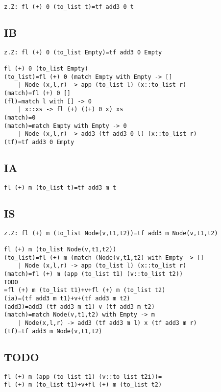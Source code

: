 \documentclass{article}
\begin{document}
\begin{lstlisting}
z.Z: fl (+) 0 (to_list t)=tf add3 0 t
\end{lstlisting}

\subsection*{IB}

\begin{lstlisting}
z.Z: fl (+) 0 (to_list Empty)=tf add3 0 Empty

fl (+) 0 (to_list Empty)
(to_list)=fl (+) 0 (match Empty with Empty -> []
	| Node (x,l,r) -> app (to_list l) (x::to_list r)
(match)=fl (+) 0 []
(fl)=match l with [] -> 0
	| x::xs -> fl (+) ((+) 0 x) xs
(match)=0
(match)=match Empty with Empty -> 0
	| Node (x,l,r) -> add3 (tf add3 0 l) (x::to_list r)
(tf)=tf add3 0 Empty
\end{lstlisting}

\subsection*{IA}

\begin{lstlisting}
fl (+) m (to_list t)=tf add3 m t
\end{lstlisting}

\subsection*{IS}

\begin{lstlisting}
z.Z: fl (+) m (to_list Node(v,t1,t2))=tf add3 m Node(v,t1,t2)

fl (+) m (to_list Node(v,t1,t2))
(to_list)=fl (+) m (match (Node(v,t1,t2) with Empty -> []
	| Node (x,l,r) -> app (to_list l) (x::to_list r)
(match)=fl (+) m (app (to_list t1) (v::to_list t2))
TODO
=fl (+) m (to_list t1)+v+fl (+) m (to_list t2)
(ia)=(tf add3 m t1)+v+(tf add3 m t2)
(add3)=add3 (tf add3 m t1) v (tf add3 m t2)
(match)=match Node(v,t1,t2) with Empty -> m
	| Node(x,l,r) -> add3 (tf add3 m l) x (tf add3 m r)
(tf)=tf add3 m Node(v,t1,t2)
\end{lstlisting}

\subsection*{TODO}

\begin{lstlisting}
fl (+) m (app (to_list t1) (v::to_list t2i))=
fl (+) m (to_list t1)+v+fl (+) m (to_list t2)
\end{lstlisting}
\end{document}
